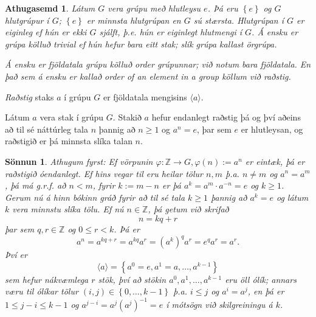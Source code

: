 \documentclass[a4paper,icelandic,11pt]{book}
\theoremstyle{plain}
\newtheorem*{ath}{Athugasemd}
\newtheorem*{sonnun}{Sönnun}
\newcommand{\Z}{\mathbb{Z}}
\begin{document}
\begin{ath}
  Látum $G$ vera grúpu með hlutleysu $e$. Þá eru $\left\{ e \right\}$ og
  $G$ hlutgrúpur í $G$; $\left\{ e \right\}$ er minnsta hlutgrúpan en $G$ sú
  stærsta. Hlutgrúpan í $G$ er \emph{eiginleg} ef hún er ekki $G$ sjálft, þ.e.
  hún er eiginlegt hlutmengi í $G$. Á ensku er grúpa kölluð \emph{trivial} ef
  hún hefur bara eitt stak; slík grúpa kallast
  \emph{örgrúpa}.

  Á ensku er fjöldatala grúpu kölluð \emph{order} grúpunnar; við notum bara
  \emph{fjöldatala}. En það sem á ensku er kallað 
  \emph{order of an element in a group} köllum við
  \emph{raðstig}.
\end{ath}
\begin{skilgr}
  \emph{Raðstig} staks $a$ í grúpu $G$ er fjöldatala mengisins
  $\langle a\rangle$.
\end{skilgr}

\begin{setn}
  Látum $a$ vera stak í grúpu $G$. Stakið $a$ hefur endanlegt raðstig þá og
  því aðeins að til sé náttúrleg tala $n$ þannig að $n\ge 1$ og $a^n = e$,
  þar sem $e$ er hlutleysan, og raðstigið er þá minnsta slíka talan $n$.
\end{setn}

\begin{sonnun}
  Athugum fyrst: Ef vörpunin $\varphi:\Z\to G, \varphi(n):= a^n$ er eintæk,
  þá er raðstigið óendanlegt. Ef hins vegar til eru heilar tölur $n,m$ þ.a.
  $n\neq m$ og $a^{n} = a^m$, þá má g.r.f. að $n < m$, fyrir $k:= m-n$ er þá
  $a^k = a^m \cdot a^{-n} = e$ og $k\ge 1$.
  Gerum nú á hinn bókinn gráð fyrir að til sé tala $k\ge 1$ þannig að $a^k =
  e$ og látum $k$ vera \emph{minnstu} slíka tölu. Ef nú $n\in \Z$, þá getum
  við skrifað\[
  n = kq + r
  \]
  þar sem $q,r\in \Z$ og $0\le r < k$. Þá er\[
  a^n = a^{kq+ r} = a^{kq} a^r = \left( a^k \right)^q a^r = e^q a^r = a^r.
  \]
  Því er\[
  \langle a \rangle = \left\{ a^0 = e, a^1 = a,\dots, a^{k-1} \right\}
  \]
  sem hefur nákvæmlega $r$ stök, því að stökin $a^0, a^1, \dots, a^{k-1}$ eru
  öll ólík; annars væru til ólíkar tölur $\left( i,j \right)\in \left\{
  0,\dots,k-1
  \right\}$ þ.a. $i\le j$ og $a^i = a^j$, en þá er $1\le j-i \le k-1$ og
  $a^{j-i} = a^j\left( a^j \right)^{-1} = e$ í mótsögn við skilgreiningu á
  $k$.
\end{sonnun}
\end{document}
